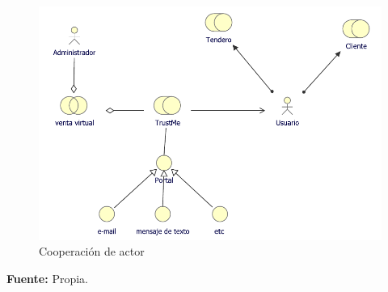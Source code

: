 {		\begin{figure}[H]
			\centering
			\includegraphics[width=0.8\linewidth]{development/cooperacionactor.pdf}
			\caption{Cooperación de actor}
		\end{figure}
		\begin{center}
			\textbf{Fuente:} Propia.
		\end{center}
	}
	
